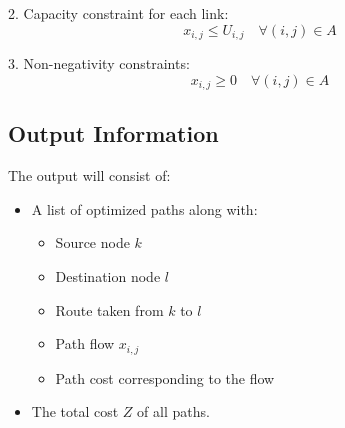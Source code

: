 \documentclass{article}
\begin{document}
2. Capacity constraint for each link:
\[
x_{i,j} \leq U_{i,j} \quad \forall (i,j) \in A
\]

3. Non-negativity constraints:
\[
x_{i,j} \geq 0 \quad \forall (i,j) \in A
\]

\subsection*{Output Information}
The output will consist of:
\begin{itemize}
    \item A list of optimized paths along with:
    \begin{itemize}
        \item Source node \(k\) 
        \item Destination node \(l\)
        \item Route taken from \(k\) to \(l\)
        \item Path flow \(x_{i,j}\)
        \item Path cost corresponding to the flow
    \end{itemize}
    \item The total cost \(Z\) of all paths.
\end{itemize}
\end{document}
